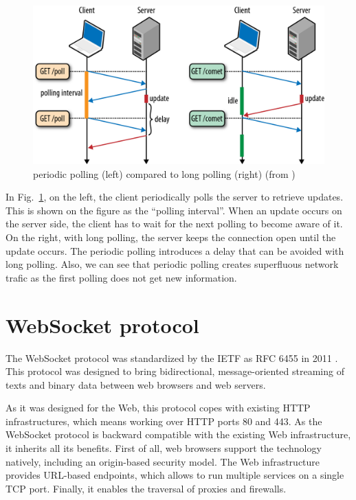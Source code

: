 \documentclass[10pt,journal,compsoc]{IEEEtran}
\newcommand{\ws}{WebSocket}
\begin{document}
\begin{figure}[!ht]
  \centering
  \includegraphics[width=\linewidth]{poll_vs_lpoll}
  \caption{periodic polling (left) compared to long polling (right) (from \cite{HighPerfBrowserNetworking:polling})}
  \label{poll_vs_lpoll}
\end{figure}

In Fig.~\ref{poll_vs_lpoll}, on the left, the client periodically polls the server to retrieve updates. This is shown on the figure as the ``polling interval''. When an update occurs on the server side, the client has to wait for the next polling to become aware of it. On the right, with long polling, the server keeps the connection open until the update occurs. The periodic polling introduces a delay that can be avoided with long polling. Also, we can see that periodic polling creates superfluous network trafic as the first polling does not get new information.

\section{\ws{} protocol}
\label{sec:ws}
The \ws{} protocol was standardized by the IETF as RFC 6455 in 2011 \cite{rfc6455}.
This protocol was designed to bring bidirectional, message-oriented streaming of texts and binary data between web browsers and web servers.


As it was designed for the Web, this protocol copes with existing HTTP infrastructures, which means working over HTTP ports 80 and 443. %
As the \ws{} protocol is backward compatible with the existing Web infrastructure, it inherits all its benefits. %
First of all, web browsers support the technology natively, including an origin-based security model. %
The Web infrastructure provides URL-based endpoints, which allows to run multiple services on a single TCP port.
Finally, it enables the traversal of proxies and firewalls.
\end{document}
